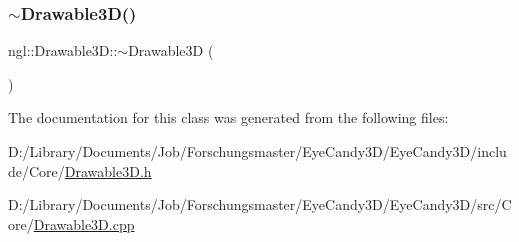 \mbox{\label{classngl_1_1_drawable3_d_a8f47486f9d8a8ed14562df6c2727287f}} 
\subsubsection{\texorpdfstring{$\sim$\+Drawable3\+D()}{~Drawable3D()}}
{\footnotesize\ttfamily ngl\+::\+Drawable3\+D\+::$\sim$\+Drawable3D (\begin{DoxyParamCaption}{ }\end{DoxyParamCaption})\hspace{0.3cm}{\ttfamily [virtual]}}



The documentation for this class was generated from the following files\+:\begin{DoxyCompactItemize}
\item 
D\+:/\+Library/\+Documents/\+Job/\+Forschungsmaster/\+Eye\+Candy3\+D/\+Eye\+Candy3\+D/include/\+Core/\mbox{\hyperlink{_drawable3_d_8h}{Drawable3\+D.\+h}}\item 
D\+:/\+Library/\+Documents/\+Job/\+Forschungsmaster/\+Eye\+Candy3\+D/\+Eye\+Candy3\+D/src/\+Core/\mbox{\hyperlink{_drawable3_d_8cpp}{Drawable3\+D.\+cpp}}\end{DoxyCompactItemize}
